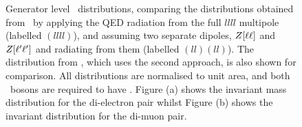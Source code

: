 \begin{figure}
\centering
        \vspace{-5mm}
        \vspace{-2mm}
    \caption[Generator level \mZ\ distributions,
    comparing the distributions obtained from \sherpa\ using two different
    models for QED radiation.]{ \small Generator level \mZ\ distributions,
    comparing the distributions obtained from \sherpa\ by applying the QED
    radiation from the full $llll$ multipole (labelled $(llll)$), and assuming two
    separate dipoles, $Z[\ell\ell]$ and $Z[\ell'\ell']$ and radiating from
    them (labelled $(ll)(ll)$). The distribution from \powhegbox, which uses the
    second approach, is also shown for comparison. All distributions are
    normalised to unit area, and both \Z\ bosons are required to have \sstooos. Figure (a)
    shows the invariant mass distribution for the di-electron pair whilst Figure 
    (b) shows the invariant distribution for the di-muon pair.
}
    \label{fig:gen-comp-SherpaQED}
\end{figure}


